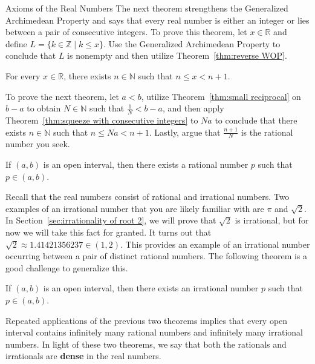 \begin{section}{Axioms of the Real Numbers}
The next theorem strengthens the Generalized Archimedean Property and says that every real number is either an integer or lies between a pair of consecutive integers. To prove this theorem, let $x\in\mathbb{R}$ and define $L=\{k\in\mathbb{Z}\mid k\leq x\}$. Use the Generalized Archimedean Property to conclude that $L$ is nonempty and then utilize Theorem~\ref{thm:reverse WOP}.

\begin{theorem}\label{thm:squeeze with consecutive integers}
For every $x\in\mathbb{R}$, there exists $n\in \mathbb{N}$ such that $n\leq x<n+1$.
\end{theorem}

To prove the next theorem, let $a<b$, utilize Theorem~\ref{thm:small reciprocal} on $b-a$ to obtain $N\in\mathbb{N}$ such that $\frac{1}{N}<b-a$, and then apply Theorem~\ref{thm:squeeze with consecutive integers} to $Na$ to conclude that there exists $n\in\mathbb{N}$ such that $n\leq Na<n+1$. Lastly, argue that $\frac{n+1}{N}$ is the rational number you seek.

\begin{theorem}\label{thm:rationals dense}
If $(a,b)$ is an open interval, then there exists a rational number $p$ such that $p\in(a,b)$.
\end{theorem}

Recall that the real numbers consist of rational and irrational numbers.  Two examples of an irrational number that you are likely familiar with are $\pi$ and  $\sqrt{2}$. In Section~\ref{sec:irrationality of root 2}, we will prove that $\sqrt{2}$ is irrational, but for now we will take this fact for granted. It turns out that $\sqrt{2}\approx 1.41421356237\in (1,2)$. This provides an example of an irrational number occurring between a pair of distinct rational numbers. The following theorem is a good challenge to generalize this.

\begin{theorem}\label{thm:irrationals dense}
If $(a,b)$ is an open interval, then there exists an irrational number $p$ such that $p\in(a,b)$.
\end{theorem}

Repeated applications of the previous two theorems implies that every open interval contains infinitely many rational numbers and infinitely many irrational numbers. In light of these two theorems, we say that both the rationals and irrationals are \textbf{dense} in the real numbers. 


\end{section}
